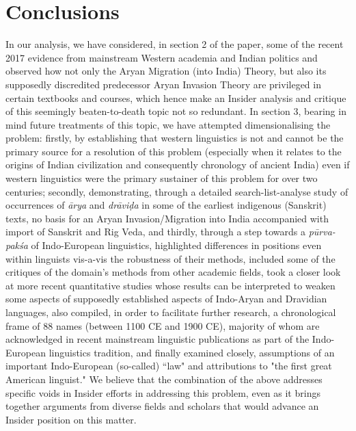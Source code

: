 \section{Conclusions}

In our analysis, we have considered, in section 2 of the paper, some of the recent 2017 evidence from mainstream Western academia and Indian politics and observed how not only the Aryan Migration (into India) Theory, but also its supposedly discredited predecessor Aryan Invasion Theory are privileged in certain textbooks and courses, which hence make an Insider analysis and critique of this seemingly beaten-to-death topic not so redundant. In section 3, bearing in mind future treatments of this topic, we have attempted dimensionalising the problem: firstly, by establishing that western linguistics is not and cannot be the primary source for a resolution of this problem (especially when it relates to the origins of Indian civilization and consequently chronology of ancient India) even if western linguistics were the primary sustainer of this problem for over two centuries; secondly, demonstrating, through a detailed search-list-analyse study of occurrences of \textit{ārya} and \textit{drāviḍa} in some of the earliest indigenous (Sanskrit) texts, no basis for an Aryan Invasion/Migration into India accompanied with import of Sanskrit and Rig Veda, and thirdly, through a step towards a \textit{pūrva-pakśa} of Indo-European linguistics, highlighted differences in positions even within linguists vis-a-vis the robustness of their methods, included some of the critiques of the domain's methods from other academic fields, took a closer look at more recent quantitative studies whose results can be interpreted to weaken some aspects of supposedly established aspects of Indo-Aryan and Dravidian languages, also compiled, in order to facilitate further research, a chronological frame of 88 names (between 1100 CE and 1900 CE), majority of whom are acknowledged in recent mainstream linguistic publications as part of the Indo-European linguistics tradition, and finally examined closely, assumptions of an important Indo-European (so-called) ``law" and attributions to "the first great American linguist." We believe that the combination of the above addresses specific voids in Insider efforts in addressing this problem, even as it brings together arguments from diverse fields and scholars that would advance an Insider position on this matter.

\newpage

